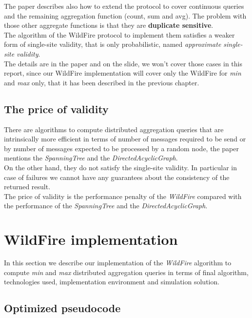 \documentclass{article}
\begin{document}
The paper describes also how to extend the protocol to cover continuous queries and the remaining aggregation function (count, sum and avg).
The problem with those other aggregate functions is that they are \textbf{duplicate sensitive}.  \\
The algorithm of the WildFire protocol to implement them satisfies a weaker form of single-site validity, that is only probabilistic, named \emph{approximate single-site validity}. \\ 
The details are in the paper and on the slide, we won't cover those cases in this report, since our WildFire implementation will cover only the WildFire for \emph{min} and \emph{max} only, that it has been described in the previous chapter.

\subsection{The price of validity}

There are algorithms to compute distributed aggregation queries that are intrinsically more efficient in terms of number of messages required to be send or by number of messages expected to be processed by a random node, the paper mentions the \emph{SpanningTree} and the \emph{DirectedAcyclicGraph}. \\ 
On the other hand, they do not satisfy the single-site validity. In particular in case of failures we cannot have any guarantees about the consistency of the returned result. \\
The price of validity is the performance penalty of the \emph{WildFire} compared with the performance of the \emph{SpanningTree} and the \emph{DirectedAcyclicGraph}.

\section{WildFire implementation}

In this section we describe our implementation of the \emph{WildFire} algorithm to compute \emph{min} and \emph{max} distributed aggregation queries in terms of final algorithm, technologies used, implementation environment and simulation solution.

\subsection{Optimized pseudocode}
\end{document}
